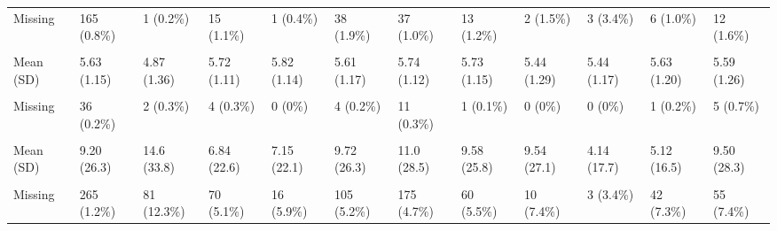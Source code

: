 \documentclass[
  single column]{article}
\begin{document}
\begin{landscape}
\begin{longtable}[t]{llllllllllll}
Missing & 165 (0.8\%) & 1 (0.2\%) & 15 (1.1\%) & 1 (0.4\%) & 38 (1.9\%) & 37 (1.0\%) & 13 (1.2\%) & 2 (1.5\%) & 3 (3.4\%) & 6 (1.0\%) & 12 (1.6\%)\\
\cellcolor{gray!10}{Honesty-Humility (Personality Trait)} & \cellcolor{gray!10}{} & \cellcolor{gray!10}{} & \cellcolor{gray!10}{} & \cellcolor{gray!10}{} & \cellcolor{gray!10}{} & \cellcolor{gray!10}{} & \cellcolor{gray!10}{} & \cellcolor{gray!10}{} & \cellcolor{gray!10}{} & \cellcolor{gray!10}{} & \cellcolor{gray!10}{}\\
\addlinespace
Mean (SD) & 5.63 (1.15) & 4.87 (1.36) & 5.72 (1.11) & 5.82 (1.14) & 5.61 (1.17) & 5.74 (1.12) & 5.73 (1.15) & 5.44 (1.29) & 5.44 (1.17) & 5.63 (1.20) & 5.59 (1.26)\\
\cellcolor{gray!10}{Median [Min, Max]} & \cellcolor{gray!10}{5.75 [1.00, 7.00]} & \cellcolor{gray!10}{5.00 [1.00, 7.00]} & \cellcolor{gray!10}{6.00 [1.25, 7.00]} & \cellcolor{gray!10}{6.00 [2.00, 7.00]} & \cellcolor{gray!10}{5.75 [1.00, 7.00]} & \cellcolor{gray!10}{6.00 [1.00, 7.00]} & \cellcolor{gray!10}{6.00 [1.00, 7.00]} & \cellcolor{gray!10}{5.50 [1.50, 7.00]} & \cellcolor{gray!10}{5.67 [2.00, 7.00]} & \cellcolor{gray!10}{6.00 [1.00, 7.00]} & \cellcolor{gray!10}{5.75 [1.00, 7.00]}\\
Missing & 36 (0.2\%) & 2 (0.3\%) & 4 (0.3\%) & 0 (0\%) & 4 (0.2\%) & 11 (0.3\%) & 1 (0.1\%) & 0 (0\%) & 0 (0\%) & 1 (0.2\%) & 5 (0.7\%)\\
\cellcolor{gray!10}{Hours Spent with Children per Week} & \cellcolor{gray!10}{} & \cellcolor{gray!10}{} & \cellcolor{gray!10}{} & \cellcolor{gray!10}{} & \cellcolor{gray!10}{} & \cellcolor{gray!10}{} & \cellcolor{gray!10}{} & \cellcolor{gray!10}{} & \cellcolor{gray!10}{} & \cellcolor{gray!10}{} & \cellcolor{gray!10}{}\\
Mean (SD) & 9.20 (26.3) & 14.6 (33.8) & 6.84 (22.6) & 7.15 (22.1) & 9.72 (26.3) & 11.0 (28.5) & 9.58 (25.8) & 9.54 (27.1) & 4.14 (17.7) & 5.12 (16.5) & 9.50 (28.3)\\
\addlinespace
\cellcolor{gray!10}{Median [Min, Max]} & \cellcolor{gray!10}{0 [0, 168]} & \cellcolor{gray!10}{0 [0, 168]} & \cellcolor{gray!10}{0 [0, 168]} & \cellcolor{gray!10}{0 [0, 168]} & \cellcolor{gray!10}{0 [0, 168]} & \cellcolor{gray!10}{0 [0, 168]} & \cellcolor{gray!10}{0 [0, 168]} & \cellcolor{gray!10}{0 [0, 168]} & \cellcolor{gray!10}{0 [0, 150]} & \cellcolor{gray!10}{0 [0, 168]} & \cellcolor{gray!10}{0 [0, 168]}\\
Missing & 265 (1.2\%) & 81 (12.3\%) & 70 (5.1\%) & 16 (5.9\%) & 105 (5.2\%) & 175 (4.7\%) & 60 (5.5\%) & 10 (7.4\%) & 3 (3.4\%) & 42 (7.3\%) & 55 (7.4\%)\\

\end{longtable}
\end{landscape}
\end{document}
